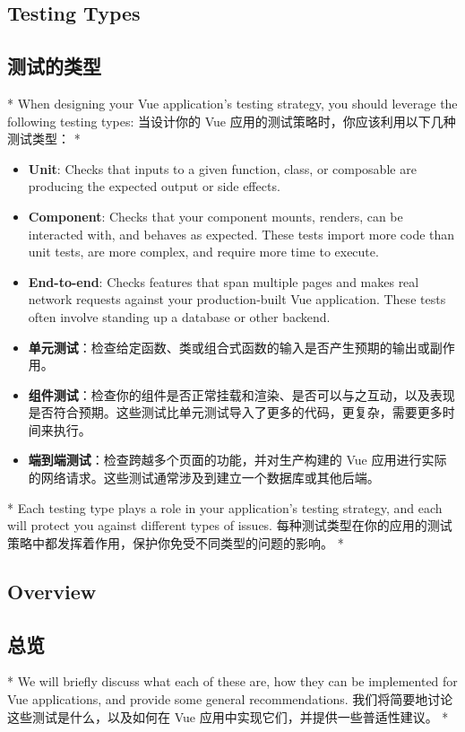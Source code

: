 \begin{paracol}{2}
\subsection{Testing Types}
\switchcolumn
\subsection{测试的类型}
\switchcolumn[0]*%
When designing your Vue application's testing strategy, you should
leverage the following testing types:
\switchcolumn
当设计你的 Vue 应用的测试策略时，你应该利用以下几种测试类型：
\switchcolumn[0]*%
\begin{itemize}
\item
  \textbf{Unit}: Checks that inputs to a given function, class, or
  composable are producing the expected output or side effects.
\item
  \textbf{Component}: Checks that your component mounts, renders, can be
  interacted with, and behaves as expected. These tests import more code
  than unit tests, are more complex, and require more time to execute.
\item
  \textbf{End-to-end}: Checks features that span multiple pages and
  makes real network requests against your production-built Vue
  application. These tests often involve standing up a database or other
  backend.
\end{itemize}
\switchcolumn
\begin{itemize}
\item
  \textbf{单元测试}：检查给定函数、类或组合式函数的输入是否产生预期的输出或副作用。
\item
  \textbf{组件测试}：检查你的组件是否正常挂载和渲染、是否可以与之互动，以及表现是否符合预期。这些测试比单元测试导入了更多的代码，更复杂，需要更多时间来执行。
\item
  \textbf{端到端测试}：检查跨越多个页面的功能，并对生产构建的 Vue
  应用进行实际的网络请求。这些测试通常涉及到建立一个数据库或其他后端。
\end{itemize}
\switchcolumn[0]*%
Each testing type plays a role in your application's testing strategy,
and each will protect you against different types of issues.
\switchcolumn
每种测试类型在你的应用的测试策略中都发挥着作用，保护你免受不同类型的问题的影响。
\switchcolumn[0]*%
\subsection{Overview}
\switchcolumn
\subsection{总览}
\switchcolumn[0]*%
We will briefly discuss what each of these are, how they can be
implemented for Vue applications, and provide some general
recommendations.
\switchcolumn
我们将简要地讨论这些测试是什么，以及如何在 Vue
应用中实现它们，并提供一些普适性建议。
\switchcolumn[0]*%

\end{paracol}
